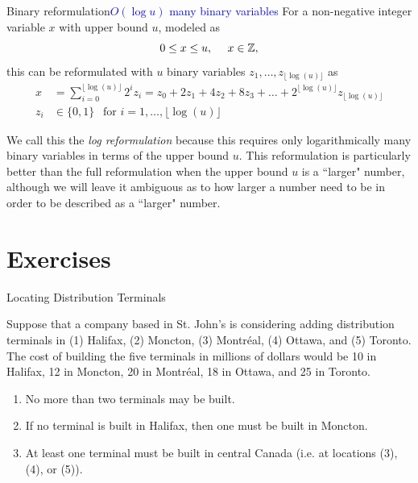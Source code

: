 {\begin{general}{Binary reformulation}{\textcolor{blue}{$O(\log u)$ many binary variables}}
\label{general:log-reformulation}
For a non-negative integer variable $x$ with upper bound $u$, modeled as 
\begin{equation}
0 \leq x \leq u, \ \ \ \ x \in {\mathbb{Z}},
\end{equation}
this can be reformulated with $u$ binary variables $z_1, \dots, z_{\lfloor\log( u )\rfloor}$ as 
\begin{equation}
\begin{split}
x & = \sum_{i=0}^{\lfloor\log( u )\rfloor}2^i z_i = z_0 + 2 z_1 +  4 z_2 + 8 z_3 + \dots + 2^{\lfloor\log( u )\rfloor} z_{\lfloor\log( u )\rfloor}\\
z_i & \in \{0,1\} \ \ \text{ for } i=1, \dots, \lfloor\log( u )\rfloor
\end{split}
\end{equation}
\end{general}
We call this the \emph{log reformulation} because this requires only logarithmically many binary variables in terms of the upper bound $u$.   This reformulation is particularly better than the full reformulation when the upper bound $u$ is a ``larger" number, although we will leave it ambiguous as to how larger a number need to be in order to be described as a ``larger" number. 

\section{Exercises}
\begin{ex}{Locating Distribution Terminals}{}{}

Suppose that a company based in St. John's is considering adding distribution terminals in (1) Halifax, (2) Moncton, (3) Montréal, (4) Ottawa, and (5) Toronto.\\

The cost of building the five terminals in millions of dollars would be 10 in Halifax, 12 in Moncton, 20 in Montréal, 18 in Ottawa, and 25 in Toronto. 
\begin{enumerate}
\item No more than two terminals may be built. 
\item If no terminal is built in Halifax, then one must be built in Moncton. 
\item At least one terminal must be built in central Canada (i.e. at locations (3), (4), or (5)).
\end{enumerate}


\end{ex}}
